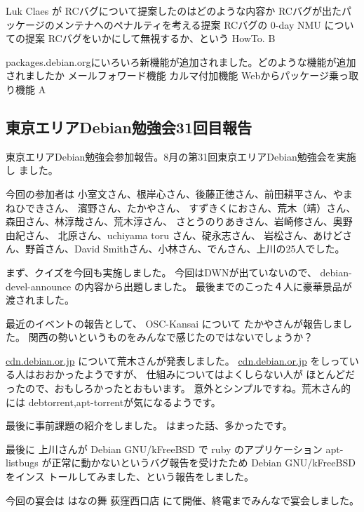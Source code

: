 \documentclass[mingoth,a4paper]{jsarticle}
\begin{document}
\santaku
{Luk Claes が RCバグについて提案したのはどのような内容か}
{RCバグが出たパッケージのメンテナへのペナルティを考える提案}
{RCバグの 0-day NMU についての提案}
{RCバグをいかにして無視するか、という HowTo.}
{B}

\santaku
{packages.debian.orgにいろいろ新機能が追加されました。どのような機能が追加されましたか}
{メールフォワード機能}
{カルマ付加機能}
{Webからパッケージ乗っ取り機能}
{A}



\subsection{東京エリアDebian勉強会31回目報告}

東京エリアDebian勉強会参加報告。8月の第31回東京エリアDebian勉強会を実施し
ました。

 今回の参加者は 小室文さん、根岸心さん、後藤正徳さん、前田耕平さん、やまねひできさん、
濱野さん、たかやさん、 すずきくにおさん、荒木（靖）さん、森田さん、林淳哉さん、荒木淳さん、
さとうのりあきさん、岩崎修さん、奥野由紀さん、 北原さん、uchiyama toru さん、碇永志さん、 
岩松さん、あけどさん、野首さん、David Smithさん、小林さん、でんさん、上川の25人でした。

まず、クイズを今回も実施しました。 今回はDWNが出ていないので、
debian-devel-announce の内容から出題しました。 
最後までのこった４人に豪華景品が渡されました。

最近のイベントの報告として、 OSC-Kansai について たかやさんが報告しました。 
関西の勢いというものをみんなで感じたのではないでしょうか？

\url{cdn.debian.or.jp} について荒木さんが発表しました。 
\url{cdn.debian.or.jp} をしっている人はおおかったようですが、
仕組みについてはよくしらない人が ほとんどだったので、おもしろかったとおもいます。
意外とシンプルですね。荒木さん的には debtorrent,apt-torrentが気になるようです。 

最後に事前課題の紹介をしました。
はまった話、多かったです。

最後に 上川さんが Debian GNU/kFreeBSD で ruby のアプリケーション apt-listbugs
が正常に動かないというバグ報告を受けたため Debian GNU/kFreeBSD をインス
トールしてみました、という報告をしました。

今回の宴会は  はなの舞 荻窪西口店 にて開催、終電までみんなで宴会しました。

\label{debianexim}
\end{document}
